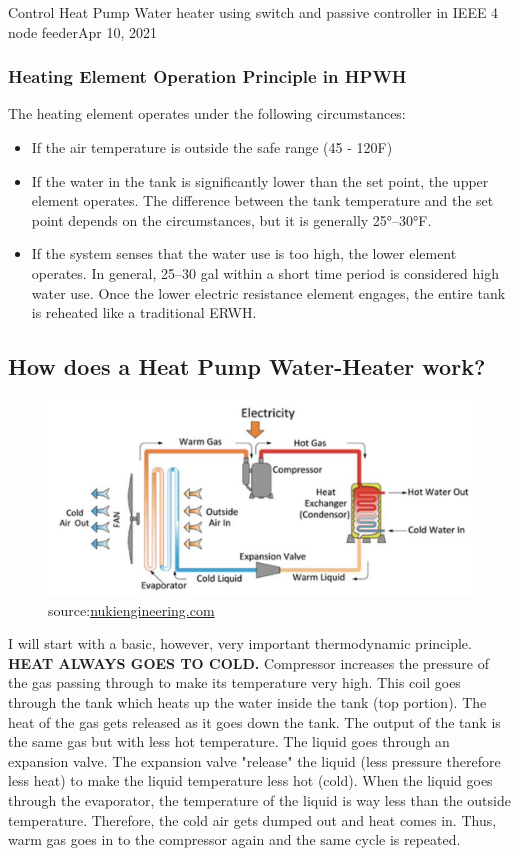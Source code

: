 \begin{entry}{Control Heat Pump Water heater using switch and passive controller in IEEE 4 node feeder}{Apr 10, 2021}
\subsubsection{Heating Element Operation Principle in HPWH}
The heating element operates under the following circumstances:
\begin{itemize}
    \item If the air temperature is outside the safe range (45 - 120F)
    \item If the water in the tank is significantly lower than the set point, the upper element operates. The difference between the tank temperature and the set point depends on the circumstances, but it is generally 25°–30°F.
    \item If the system senses that the water use is too high, the lower element operates. In general, 25–30 gal within a short time period is considered high water use. Once the lower electric resistance element engages, the entire tank is reheated like a traditional ERWH.
\end{itemize}
\newpage
\subsection{How does a Heat Pump Water-Heater work?}
    \begin{figure}[htp!]
        \centering
        \includegraphics[width=1.1\columnwidth]{Spring2021/HPWH_working_principle.png}
        \caption{source:\href{https://inukiengineering.com/heat-pump-water-heaters/}{nukiengineering.com}}
        \label{fig:EWH}
    \end{figure}
I will start with a basic, however, very important thermodynamic principle. \textbf{HEAT ALWAYS GOES TO COLD.} Compressor increases the pressure of the gas passing through to make its temperature very high. This coil goes through the tank which heats up the water inside the tank (top portion). The heat of the gas gets released as it goes down the tank. The output of the tank is the same gas but with less hot temperature. The liquid goes through an expansion valve. The expansion valve "release" the liquid (less pressure therefore less heat) to make the liquid temperature less hot (cold). When the liquid goes through the evaporator, the temperature of the liquid is way less than the outside temperature. Therefore, the cold air gets dumped out and heat comes in. Thus, warm gas goes in to the compressor again and the same cycle is repeated.
\newpage

\end{entry}
